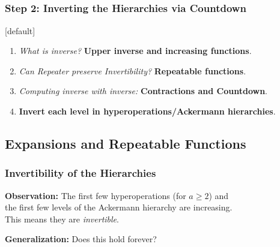 \subsection*{}
\begin{frame}
\frametitle{Step 2: Inverting the Hierarchies via \textbf{Countdown}}
[default]

\begin{enumerate}[\bfseries 1.]
	\itemsep 3ex
	\item<done@1->
	\emph{What is inverse?} \textbf{Upper inverse and increasing functions}.
	
	\item<come@2->
	\emph{Can Repeater preserve Invertibility?} \textbf{Repeatable functions}.
	
	\item
	\emph{Computing inverse with inverse:} \textbf{Contractions and Countdown}.
	
	\item
	\textbf{Invert each level in hyperoperations/Ackermann hierarchies}.
\end{enumerate}
\end{frame}


\subsection{Expansions and Repeatable Functions}

\begin{frame}
\frametitle{Invertibility of the Hierarchies}

\textbf{Observation:} The first few hyperoperations (for $a\ge 2$) and \\ the first few levels of the Ackermann hierarchy are increasing. \\This means they are \emph{invertible}.

\bigskip

\pause 
\textbf{Generalization:} Does this hold forever?

\bigskip

\pause 
{}

%
%
\end{frame}


